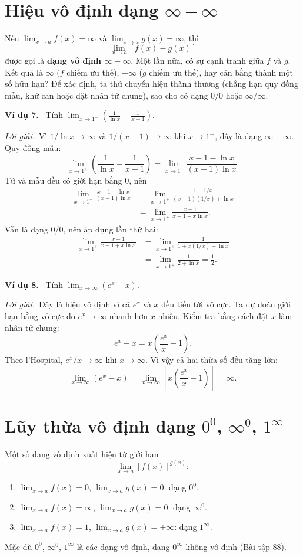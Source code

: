 \documentclass[12pt,a4paper]{article}
\newcommand{\ex}[1]{\par\medskip\noindent\textbf{Ví dụ #1.}\ }
\newcommand{\sol}{\par\nopagebreak[4]\noindent\textit{Lời giải.}\ }
\begin{document}
\section*{Hiệu vô định dạng $\infty-\infty$}
Nếu $\lim_{x\to a}f(x)=\infty$ và $\lim_{x\to a}g(x)=\infty$, thì
\[\lim_{x\to a}[f(x)-g(x)]\]
được gọi là \textbf{dạng vô định $\infty-\infty$}. Một lần nữa, có sự cạnh tranh giữa $f$ và $g$. Kết quả là $\infty$ ($f$ chiếm ưu thế), $-\infty$ ($g$ chiếm ưu thế), hay cân bằng thành một số hữu hạn? Để xác định, ta thử chuyển hiệu thành thương (chẳng hạn quy đồng mẫu, khử căn hoặc đặt nhân tử chung), sao cho có dạng $0/0$ hoặc $\infty/\infty$.
\ex{7} Tính $\displaystyle\lim_{x\to1^+}\left(\frac1{\ln x}-\frac1{x-1}\right)$.
\sol Vì $1/\ln x\to\infty$ và $1/(x-1)\to\infty$ khi $x\to1^+$, đây là dạng $\infty-\infty$. Quy đồng mẫu:
\[\lim_{x\to1^+}\left(\frac1{\ln x}-\frac1{x-1}\right)
=\lim_{x\to1^+}\frac{x-1-\ln x}{(x-1)\ln x}.\]
Tử và mẫu đều có giới hạn bằng 0, nên
\begin{align*}
\lim_{x\to1^+}\frac{x-1-\ln x}{(x-1)\ln x}
&=\lim_{x\to1^+}\frac{1-1/x}{(x-1)(1/x)+\ln x}\\
&=\lim_{x\to1^+}\frac{x-1}{x-1+x\ln x}.
\end{align*}
Vẫn là dạng $0/0$, nên áp dụng lần thứ hai:
\begin{align*}
\lim_{x\to1^+}\frac{x-1}{x-1+x\ln x}
&=\lim_{x\to1^+}\frac1{1+x(1/x)+\ln x}\\
&=\lim_{x\to1^+}\frac1{2+\ln x}=\frac12.
\end{align*}
\ex{8} Tính $\displaystyle\lim_{x\to\infty}(e^x-x)$.
\sol Đây là hiệu vô định vì cả $e^x$ và $x$ đều tiến tới vô cực. Ta dự đoán giới hạn bằng vô cực do $e^x\to\infty$ nhanh hơn $x$ nhiều. Kiểm tra bằng cách đặt $x$ làm nhân tử chung:
\[e^x-x=x\left(\frac{e^x}{x}-1\right).\]
Theo l’Hospital, $e^x/x\to\infty$ khi $x\to\infty$. Vì vậy cả hai thừa số đều tăng lớn:
\[\lim_{x\to\infty}(e^x-x)
=\lim_{x\to\infty}\left[x\left(\frac{e^x}{x}-1\right)\right]=\infty.\]
\section*{Lũy thừa vô định dạng $0^0$, $\infty^0$, $1^\infty$}
Một số dạng vô định xuất hiện từ giới hạn
\[\lim_{x\to a}[f(x)]^{g(x)}:\]
\begin{enumerate}
\item $\lim_{x\to a}f(x)=0$, $\lim_{x\to a}g(x)=0$: dạng $0^0$.
\item $\lim_{x\to a}f(x)=\infty$, $\lim_{x\to a}g(x)=0$: dạng $\infty^0$.
\item $\lim_{x\to a}f(x)=1$, $\lim_{x\to a}g(x)=\pm\infty$: dạng $1^\infty$.
\end{enumerate}
Mặc dù $0^0$, $\infty^0$, $1^\infty$ là các dạng vô định, dạng $0^\infty$ không vô định (Bài tập 88).
\end{document}
